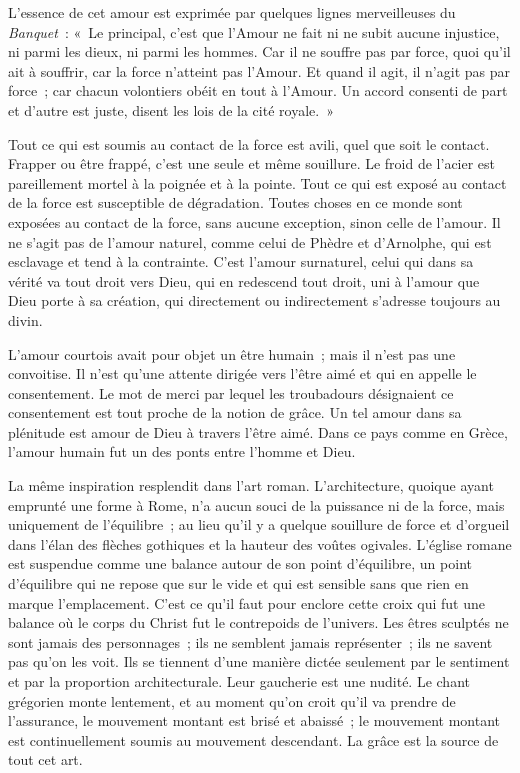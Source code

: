 \documentclass[french,twoside]{book} %
\begin{document}
L'essence de cet amour est exprimée par quelques lignes merveilleuses du {\itshape Banquet} : « Le principal, c'est que l'Amour ne fait ni ne subit aucune injustice, ni parmi les dieux, ni parmi les hommes. Car il ne souffre pas par force, quoi qu'il ait à souffrir, car la force n'atteint pas l'Amour. Et quand il agit, il n'agit pas par force ; car chacun volontiers obéit en tout à l'Amour. Un accord consenti de part et d'autre est juste, disent les lois de la cité royale. »\par
\par
Tout ce qui est soumis au contact de la force est avili, quel que soit le contact. Frapper ou être frappé, c'est une seule et même souillure. Le froid de l'acier est pareillement mortel à la poignée et à la pointe. Tout ce qui est exposé au contact de la force est susceptible de dégradation. Toutes choses en ce monde sont exposées au contact de la force, sans aucune exception, sinon celle de l'amour. Il ne s'agit pas de l'amour naturel, comme celui de Phèdre et d'Arnolphe, qui est esclavage et tend à la contrainte. C'est l'amour surnaturel, celui qui dans sa vérité va tout droit vers Dieu, qui en redescend tout droit, uni à l'amour que Dieu porte à sa création, qui directement ou indirectement s'adresse toujours au divin.\par
L'amour courtois avait pour objet un être humain ; mais il n'est pas une convoitise. Il n'est qu'une attente dirigée vers l'être aimé et qui en appelle le consentement. Le mot de merci par lequel les troubadours désignaient ce consentement est tout proche de la notion de grâce. Un tel amour dans sa plénitude est amour de Dieu à travers l'être aimé. Dans ce pays comme en Grèce, l'amour humain fut un des ponts entre l'homme et Dieu.\par
La même inspiration resplendit dans l'art roman. L'architecture, quoique ayant emprunté une forme à Rome, n'a aucun souci de la puissance ni de la force, mais uniquement de l'équilibre ; au lieu qu'il y a quelque souillure de force et d'orgueil dans l'élan des flèches gothiques et la hauteur des voûtes ogivales. L'église romane est suspendue comme une balance autour de son point d'équilibre, un point d'équilibre qui ne repose que sur le vide et qui est sensible sans que rien en marque l'emplacement. C'est ce qu'il faut pour enclore cette croix qui fut une balance où le corps du Christ fut le contrepoids de l'univers. Les êtres sculptés ne sont jamais des personnages ; ils ne sem­blent jamais représenter ; ils ne savent pas qu'on les voit. Ils se tiennent d'une manière dictée seulement par le sentiment et par la proportion architecturale. Leur gaucherie est une nudité. Le chant grégorien monte lentement, et au moment qu'on croit qu'il va prendre de l'assurance, le mouvement montant est brisé et abaissé ; le mouvement montant est continuellement soumis au mouvement descendant. La grâce est la source de tout cet art.\par
\end{document}
